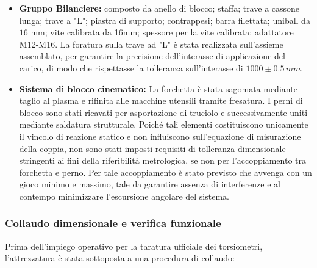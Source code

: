 \documentclass[a4paper, twoside]{article}
\begin{document}
\begin{itemize}
    \item \textbf{Gruppo Bilanciere:} composto da anello di blocco; staffa; trave a cassone lunga; trave a "L"; piastra di supporto; contrappesi; barra filettata; uniball da $16 \text{ mm}$; vite calibrata da 16mm; spessore per la vite calibrata; adattatore M12-M16. La foratura sulla trave ad "L" è stata realizzata sull'assieme assemblato, per garantire la precisione dell'interasse di applicazione del carico, di modo che rispettasse la tolleranza sull'interasse di $1000 \pm 0.5 \, mm$.
    \item \textbf{Sistema di blocco cinematico:} La forchetta è stata sagomata mediante taglio al plasma e rifinita alle macchine utensili tramite fresatura. I perni di blocco sono stati ricavati per asportazione di truciolo e successivamente uniti mediante saldatura strutturale. Poiché tali elementi costituiscono unicamente il vincolo di reazione statico e non influiscono sull'equazione di misurazione della coppia, non sono stati imposti requisiti di tolleranza dimensionale stringenti ai fini della riferibilità metrologica, se non per l'accoppiamento tra forchetta e perno. Per tale accoppiamento è stato previsto che avvenga con un gioco minimo e massimo, tale da garantire assenza di interferenze e al contempo minimizzare l'escursione angolare del sistema.
\end{itemize}

\subsubsection{Collaudo dimensionale e verifica funzionale}
Prima dell'impiego operativo per la taratura ufficiale dei torsiometri, l'attrezzatura è stata sottoposta a una procedura di collaudo:
\end{document}
